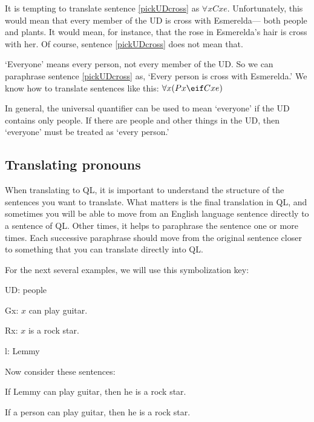 
It is tempting to translate sentence \ref{pickUDcross} as $\forall x Cxe$. Unfortunately, this would mean that every member of the UD is cross with Esmerelda--- both people and plants. It would mean, for instance, that the rose in Esmerelda's hair is cross with her. Of course, sentence \ref{pickUDcross} does not mean that.

`Everyone' means every person, not every member of the UD. So we can paraphrase sentence \ref{pickUDcross} as, `Every person is cross with Esmerelda.' We know how to translate sentences like this: $\forall x(Px \eif Cxe)$

In general, the universal quantifier can be used to mean `everyone' if the UD contains only people. If there are people and other things in the UD, then `everyone' must be treated as `every person.'





\subsection{Translating pronouns}
When translating to QL, it is important to understand the structure of the sentences you want to translate. What matters is the final translation in QL, and sometimes you will be able to move from an English language sentence directly to a sentence of QL. Other times, it helps to paraphrase the sentence one or more times. Each successive paraphrase should move from the original sentence closer to something that you can translate directly into QL.

For the next several examples, we will use this symbolization key:

\begin{ekey}
\item[UD:] people
\item[Gx:] $x$ can play guitar.
\item[Rx:] $x$ is a rock star.
\item[l:] Lemmy
\end{ekey}

Now consider these sentences:

\begin{earg}
\item[\ex{pronoun1}] If Lemmy can play guitar, then he is a rock star.
\item[\ex{pronoun2}] If a person can play guitar, then he is a rock star.
\end{earg}

